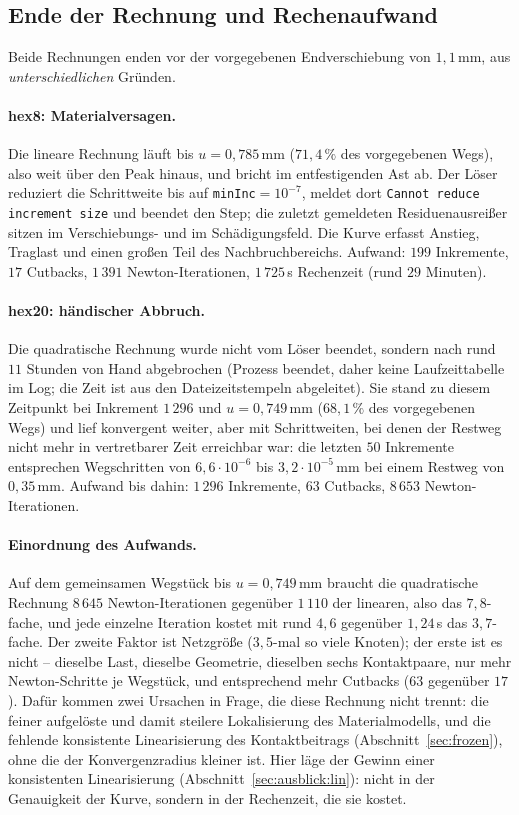 \documentclass[a4paper,11pt]{article}
\newcommand{\code}[1]{\texttt{\small #1}}
\begin{document}
\subsection{Ende der Rechnung und Rechenaufwand}
Beide Rechnungen enden vor der vorgegebenen Endverschiebung von $1{,}1$\,mm, aus
\emph{unterschiedlichen} Gründen.

\paragraph{hex8: Materialversagen.}
Die lineare Rechnung läuft bis $u=0{,}785$\,mm ($71{,}4\,\%$ des vorgegebenen Wegs), also weit über
den Peak hinaus, und bricht im entfestigenden Ast ab. Der Löser reduziert die Schrittweite bis auf
\code{minInc}${}=10^{-7}$, meldet dort \code{Cannot reduce increment size} und beendet den Step; die
zuletzt gemeldeten Residuenausreißer sitzen im Verschiebungs- und im Schädigungsfeld. Die Kurve
erfasst Anstieg, Traglast und einen großen Teil des Nachbruchbereichs. Aufwand: $199$ Inkremente,
$17$ Cutbacks, $1\,391$ Newton-Iterationen, $1\,725$\,s Rechenzeit (rund $29$ Minuten).

\paragraph{hex20: händischer Abbruch.}
Die quadratische Rechnung wurde nicht vom Löser beendet, sondern nach rund $11$ Stunden von Hand
abgebrochen (Prozess beendet, daher keine Laufzeittabelle im Log; die Zeit ist aus den
Dateizeitstempeln abgeleitet). Sie stand zu diesem Zeitpunkt bei Inkrement $1\,296$ und
$u=0{,}749$\,mm ($68{,}1\,\%$ des vorgegebenen Wegs) und lief konvergent weiter, aber mit
Schrittweiten, bei denen der Restweg nicht mehr in vertretbarer Zeit erreichbar war: die letzten
$50$ Inkremente entsprechen Wegschritten von $6{,}6\cdot10^{-6}$ bis $3{,}2\cdot10^{-5}$\,mm bei
einem Restweg von $0{,}35$\,mm. Aufwand bis dahin: $1\,296$ Inkremente, $63$ Cutbacks, $8\,653$
Newton-Iterationen.

\paragraph{Einordnung des Aufwands.}
Auf dem gemeinsamen Wegstück bis $u=0{,}749$\,mm braucht die quadratische Rechnung $8\,645$
Newton-Iterationen gegenüber $1\,110$ der linearen, also das $7{,}8$-fache, und jede einzelne
Iteration kostet mit rund $4{,}6$ gegenüber $1{,}24$\,s das $3{,}7$-fache. Der zweite Faktor ist
Netzgröße ($3{,}5$-mal so viele Knoten); der erste ist es nicht -- dieselbe Last, dieselbe
Geometrie, dieselben sechs Kontaktpaare, nur mehr Newton-Schritte je Wegstück, und entsprechend
mehr Cutbacks ($63$ gegenüber $17$). Dafür kommen zwei Ursachen in Frage, die diese Rechnung nicht
trennt: die feiner aufgelöste und damit steilere Lokalisierung des Materialmodells, und die
fehlende konsistente Linearisierung des Kontaktbeitrags (Abschnitt~\ref{sec:frozen}), ohne die der
Konvergenzradius kleiner ist. Hier läge der Gewinn einer konsistenten Linearisierung
(Abschnitt~\ref{sec:ausblick:lin}): nicht in der Genauigkeit der Kurve, sondern in der Rechenzeit,
die sie kostet.
\end{document}
